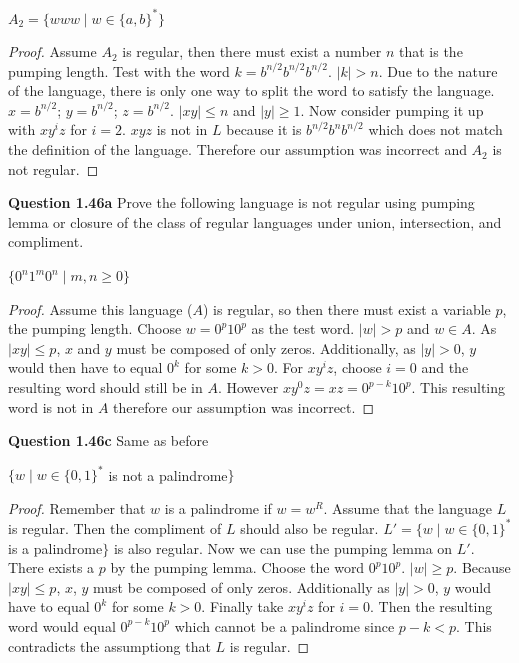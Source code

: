 \documentclass{article}
\begin{document}
        \begin{center}
            $A_2=\{www\mid w\in \{a,b\}^*\}$
        \end{center}
        \begin{proof}
            Assume $A_2$ is regular, then there must exist a number $n$ that is the pumping length. Test with the word $k = b^{n/2}b^{n/2}b^{n/2}$. $|k|>n$. Due to the nature of the language, there is only one way to split the word to satisfy the language. $x = b^{n/2}$; $y=b^{n/2}$; $z= b^{n/2}$. $|xy|\leq n$ and $|y|\geq 1$. Now consider pumping it up with $xy^iz$ for $i=2$. $xyz$ is not in $L$ because it is $b^{n/2}b^{n}b^{n/2}$ which does not match the definition of the language. Therefore our assumption was incorrect and $A_2$ is not regular.
        \end{proof}
    \textbf{Question 1.46a} Prove the following language is not regular using pumping lemma or closure of the class of regular languages under union, intersection, and compliment.
        \begin{center}
            $\{0^n1^m0^n\mid m,n \geq 0\}$
        \end{center}
        \begin{proof}
            Assume this language ($A$) is regular, so then there must exist a variable $p$, the pumping length. Choose $w = 0^p10^p$ as the test word. $|w|>p$ and $w\in A$. As $|xy|\leq p$, $x$ and $y$ must be composed of only zeros. Additionally, as $|y|>0$, $y$ would then have to equal $0^k$ for some $k>0$. For $xy^iz$, choose $i=0$ and the resulting word should still be in $A$. However $xy^0z=xz = 0^{p-k}10^p$. This resulting word is not in $A$ therefore our assumption was incorrect.
        \end{proof}
    \textbf{Question 1.46c} Same as before
        \begin{center}
            $\{w\mid w\in \{0,1\}^* $ is not a palindrome$ \}$
        \end{center}
        \begin{proof}
            Remember that $w$ is a palindrome if $w=w^R$. Assume that the language $L$ is regular. Then the compliment of $L$ should also be regular. $L' = \{w\mid w\in \{0,1\}^* $ is a palindrome$ \}$ is also regular. Now we can use the pumping lemma on $L'$. \\
            There exists a $p$ by the pumping lemma. Choose the word $0^p10^p$. $|w|\geq p$. Because $|xy|\leq p$, $x$, $y$ must be composed of only zeros. Additionally as $|y|>0$, $y$ would have to equal $0^k$ for some $k>0$. Finally take $xy^iz$ for $i=0$. Then the resulting word would equal $0^{p-k}10^p$ which cannot be a palindrome since $p-k<p$. This contradicts the assumptiong that $L$ is regular.
        \end{proof}
\end{document}
